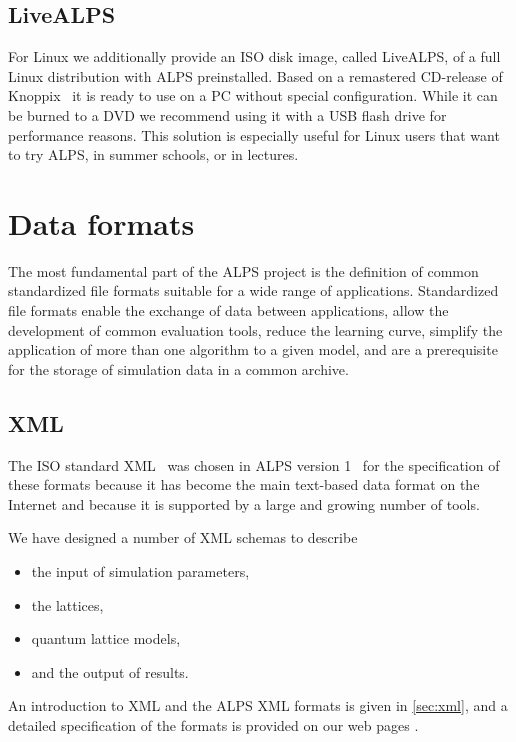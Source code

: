\documentclass[12pt]{iopart}
\begin{document}
\subsection{LiveALPS}

For Linux we additionally provide an ISO disk image, called LiveALPS, of a full Linux distribution with ALPS preinstalled. 
Based on a remastered CD-release of Knoppix~\cite{knoppix} it is ready to use 
on a PC without special configuration. While it can be burned to a DVD we recommend using it with a USB flash drive for performance reasons.
This solution is especially useful for Linux users that want to try ALPS, in summer schools, or in lectures.

\section{Data formats}

The most fundamental part of the ALPS project is the definition of
common standardized file formats suitable for a wide range of
applications. Standardized file formats enable the exchange of data
between applications, allow the development of common evaluation
tools, reduce the learning curve, simplify the application of more than one algorithm to a given
model, and are a prerequisite for the storage of simulation data in a
common archive.


\subsection{XML}


 The ISO
standard XML~\cite{xml} was chosen in ALPS version 1~\cite{ALPS1.2,ALPS1.3} for the specification of these formats
because it has become
the main text-based data format on the Internet and because it is
supported by a large and growing number of tools.

We have designed a number of XML  schemas \cite{xmlschema} to describe
\begin{itemize}
\item the input of simulation parameters,
\item the lattices,
\item quantum lattice models,   
\item and the output of results.
\end{itemize}

An introduction to XML and the ALPS XML formats is given in \ref{sec:xml}, and a  detailed specification of the formats is provided on
our web pages \cite{alps,xmlschema}.
\end{document}
